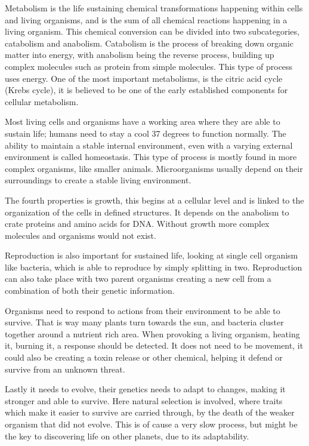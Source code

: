 Metabolism is the life sustaining chemical transformations happening within cells and living organisms, and is the sum of all chemical reactions happening in a living organism. This chemical conversion can be divided into two subcategories, catabolism and anabolism. Catabolism is the process of breaking down organic matter into energy, with anabolism being the reverse process, building up complex molecules such as protein from simple molecules. This type of process uses energy. One of the most important metabolisms, is the citric acid cycle (Krebs cycle), it is believed to be one of the early established components for cellular metabolism.

Most living cells and organisms have a working area where they are able to sustain life; humans need to stay a cool 37 degrees to function normally. The ability to maintain a stable internal environment, even with a varying external environment is called homeostasis. This type of process is mostly found in more complex organisms, like smaller animals. Microorganisms usually depend on their surroundings to create a stable living environment.

The fourth properties is growth, this begins at a cellular level and is linked to the organization of the cells in defined structures. It depends on the anabolism to crate proteins and amino acids for DNA. Without growth more complex molecules and organisms would not exist.

Reproduction is also important for sustained life, looking at single cell organism like bacteria, which is able to reproduce by simply splitting in two. Reproduction can also take place with two parent organisms creating a new cell from a combination of both their genetic information.

Organisms need to respond to actions from their environment to be able to survive. That is way many plants turn towards the sun, and bacteria cluster together around a nutrient rich area. When provoking a living organism, heating it, burning it, a response should be detected. It does not need to be movement, it could also be creating a toxin release or other chemical, helping it defend or survive from an unknown threat.

Lastly it needs to evolve, their genetics needs to adapt to changes, making it stronger and able to survive. Here natural selection is involved, where traits which make it easier to survive are carried through, by the death of the weaker organism that did not evolve. This is of cause a very slow process, but might be the key to discovering life on other planets, due to its adaptability.

